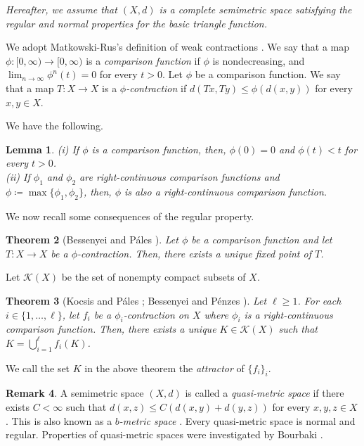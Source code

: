 \documentclass[a4paper, reqno, 11pt]{amsart}
\newtheorem{Thm}{Theorem}[section]
\newtheorem{Lem}[Thm]{Lemma}
\theoremstyle{definition}
\newtheorem{Rem}[Thm]{Remark}
\begin{document}
{\it Hereafter, we assume that $(X,d)$ is a complete semimetric space satisfying the regular and normal properties for the basic triangle function.}  



We adopt Matkowski-Rus's definition of weak contractions \cite{Matkowski1975,Rus2001}.  
We say that a map $\phi : [0,\infty) \to [0,\infty)$ is a {\it comparison function} if 
$\phi$ is nondecreasing, and 
$\lim_{n \to \infty} \phi^n (t) = 0$ for every $t > 0$. 
Let $\phi$ be a comparison function. 
We say that a map $T : X \to X$ is a {\it $\phi$-contraction} if 
$d(Tx, Ty) \le \phi(d(x,y))$ for every $x, y \in X$. 



We have the following. 
\begin{Lem}\label{lem:comparison-basic}
(i) If $\phi$ is a comparison function, then, $\phi(0) = 0$ and  $\phi(t) < t$ for every $t > 0$. \\
(ii) If $\phi_1$ and $\phi_2$ are right-continuous comparison functions and $\phi \coloneqq \max\{\phi_1, \phi_2\}$, then, $\phi$ is also a right-continuous comparison function. 
\end{Lem}

We now recall some consequences of the regular property. 

\begin{Thm}[Bessenyei and P\'ales {\cite[Theorem 1]{BessenyeiPales2017}} ]\label{thm:Bessenyei-Pales-FP} 
Let $\phi$ be a comparison function and let $T : X \to X$ be a $\phi$-contraction. 
Then, there exists a unique fixed point of $T$. 
\end{Thm}

Let $\mathcal{K}(X)$ be the set of nonempty compact subsets of $X$. 

\begin{Thm}[Kocsis and P\'ales {\cite[Theorem 17]{KocsisPales2022}}; Bessenyei and P\'{e}nzes {\cite[Theorem 2]{BessenyeiPenzes2022}}]\label{thm:attractor}
Let $\ell \ge 1$. 
For each $i \in \{1, \dots, \ell\}$, 
let $f_i$ be a $\phi_i$-contraction on $X$ where $\phi_i$ is a right-continuous comparison function.
Then, there exists a unique $K \in \mathcal{K}(X)$ such that $K = \bigcup_{i=1}^{\ell} f_i (K)$. 
\end{Thm}

We call the set $K$ in the above theorem the {\it attractor} of $\{f_i\}_i$. 


\begin{Rem}
A semimetric space $(X,d)$ is called a {\it quasi-metric space} if there exists $C < \infty$ such that $d(x,z) \le C(d(x,y) + d(y,z))$ for every $x, y, z \in X$. 
This is also known as a {\it $b$-metric space} \cite{CJT2018}. 
Every quasi-metric space is normal and regular. 
Properties of quasi-metric spaces were investigated by Bourbaki \cite{Bourbaki2007}. 
\end{Rem}
\end{document}
